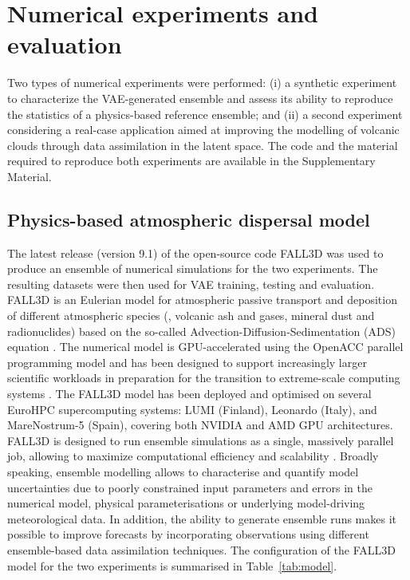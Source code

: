 \section{Numerical experiments and evaluation} \label{sec:experiments}
Two types of numerical experiments were performed: (i) a synthetic experiment \citep{mingari2026supplementary-synthetic} to characterize the VAE-generated ensemble and assess its ability to reproduce the statistics of a physics-based reference ensemble; and (ii) a second experiment \citep{mingari2026supplementary-etna} considering a real-case application aimed at improving the modelling of volcanic clouds through data assimilation in the latent space. The code and the material required to reproduce both experiments are available in the Supplementary Material.

\subsection{Physics-based atmospheric dispersal model}
The latest release (version 9.1) of the open-source code FALL3D \citep{folch2025} was used to produce an ensemble of numerical simulations for the two experiments. The resulting datasets were then used for VAE training, testing and evaluation. FALL3D is an Eulerian model for atmospheric passive transport and deposition of different atmospheric species (\eg, volcanic ash and gases, mineral dust and radionuclides) based on the so-called Advection-Diffusion-Sedimentation (ADS) equation \citep{folch2020,prata2021}. The numerical model is GPU-accelerated using the OpenACC parallel programming model and has been designed to support increasingly larger scientific workloads in preparation for the transition to extreme-scale computing systems \citep{folch2023b}. The FALL3D model has been deployed and optimised on several EuroHPC supercomputing systems: LUMI (Finland), Leonardo (Italy), and MareNostrum-5 (Spain), covering both NVIDIA and AMD GPU architectures.
%
FALL3D is designed to run ensemble simulations as a single, massively parallel job, allowing to maximize computational efficiency and scalability \citep{folch2022}. Broadly speaking, ensemble modelling allows to characterise and quantify model uncertainties due to poorly constrained input parameters and errors in the numerical model, physical parameterisations or underlying model-driving meteorological data. In addition, the ability to generate ensemble runs makes it possible to improve forecasts by incorporating observations using different ensemble-based data assimilation techniques. The configuration of the FALL3D model for the two experiments is summarised in Table~\ref{tab:model}. 
%
%
